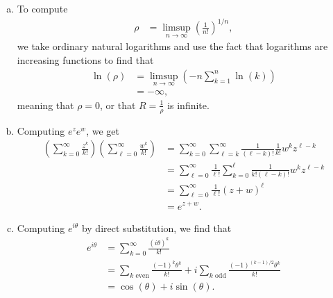 \documentclass[10pt]{mypackage}
\begin{document}
\begin{solution}\hfill
  \begin{enumerate}[(a)]
    \item To compute
      \begin{align*}
        \rho &= \limsup_{n\rightarrow\infty} \left( \frac{1}{n!} \right)^{1/n},
      \end{align*}
      we take ordinary natural logarithms and use the fact that logarithms are increasing functions to find that
      \begin{align*}
        \ln\left( \rho \right) &= \limsup_{n\rightarrow\infty} \left( -n\sum_{k=1}^{n}\ln\left( k \right) \right)\\
                               &= -\infty,
      \end{align*}
      meaning that $\rho = 0$, or that $R = \frac{1}{\rho}$ is infinite.
    \item Computing $e^{z}e^{w}$, we get
      \begin{align*}
        \left( \sum_{k=0}^{\infty}\frac{z^{k}}{k!} \right)\left( \sum_{\ell = 0}^{\infty}\frac{w^{k}}{k!} \right) &= \sum_{k=0}^{\infty}\sum_{\ell = k}^{\infty} \frac{1}{\left( \ell - k \right)!}\frac{1}{k!}w^{k}z^{\ell - k}\\
                                                                                                                  &= \sum_{\ell = 0}^{\infty} \frac{1}{\ell!} \sum_{k=0}^{\ell} \frac{1}{k!\left( \ell-k \right)!} w^{k}z^{\ell - k}\\
                                                                                                                  &= \sum_{\ell = 0}^{\infty} \frac{1}{\ell!} \left( z+w \right)^{\ell}\\
                                                                                                                  &= e^{z+w}.
      \end{align*}
    \item Computing $e^{i\theta}$ by direct substitution, we find that
      \begin{align*}
        e^{i\theta} &= \sum_{k=0}^{\infty} \frac{\left( i\theta \right)^{k}}{k!}\\
                    &= \sum_{k\text{ even}} \frac{\left( -1 \right)^{k}\theta^{k}}{k!} + i\sum_{k\text{ odd}} \frac{\left( -1 \right)^{\left( k-1 \right)/2}\theta^{k}}{k!}\\
                    &= \cos\left( \theta \right) + i\sin\left( \theta \right).
      \end{align*}
  \end{enumerate}
\end{solution}
\end{document}
